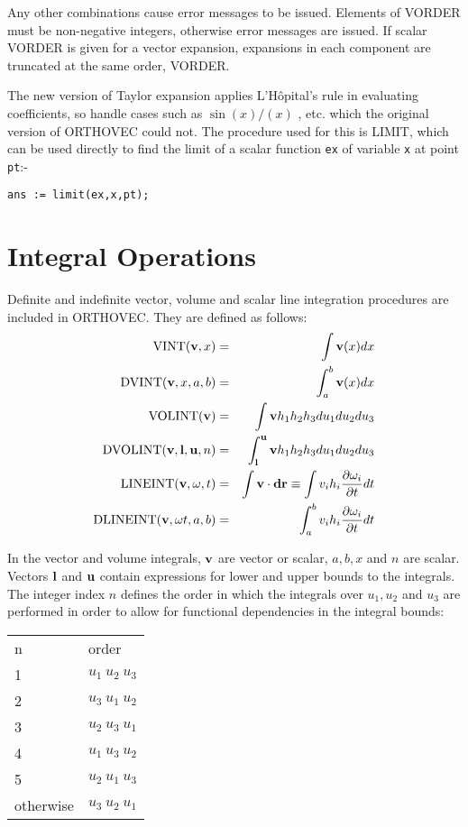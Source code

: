 Any other combinations cause error messages to be issued.  Elements of
VORDER must be non-negative integers, otherwise error
messages are issued.  If scalar VORDER is given for a vector expansion, 
expansions in each component are truncated at the same
order, VORDER.

The new version of Taylor expansion applies 
L'H\^opital's rule in evaluating coefficients, 
so handle cases such as $\sin(x) /  (x) $ , etc.
which the original version of ORTHOVEC could not. The procedure used for
this is LIMIT,
which can be used directly to find the limit of a scalar 
function {\tt ex} of variable {\tt x} at point {\tt pt}:-

\begin{verbatim}
ans := limit(ex,x,pt);
\end{verbatim}

\section{Integral Operations}
Definite and indefinite vector, volume and scalar line 
integration procedures are included in ORTHOVEC.  
They are defined as follows:
\begin{eqnarray*}
{\rm VINT} ({\bf v},x)  & = & \int {\bf v}(x)dx\\
%
{\rm DVINT} ({\bf v},x, a, b) & = & \int^b_a {\bf v} (x) dx\\
%
{\rm VOLINT} ({\bf v}) & = & \int {\bf v} h_1 h_2 h_3  du_1 du_2 du_3\\
%
{\rm DVOLINT}({\bf v},{\bf l},{\bf u},n) & = & \int^{\bf u}_{\bf l} {\bf
 v} h_1 h_2 h_3 du_1 du_2 du_3\\
%
{\rm LINEINT} ({\bf v, \omega}, t) & = & \int {\bf v} \cdot {\bf dr} 
\equiv \int v_i h_i \frac{\partial \omega_i}{\partial t} dt\\
%
{\rm DLINEINT} ({\bf v, \omega} t, a, b) & = & \int^b_a v_i h_i 
\frac{\partial \omega_i}{\partial t} dt\\
\end{eqnarray*}

In the vector and volume integrals, ${\bf v}$ are vector or scalar,  $a,
b,x$ and $n$ are scalar.  Vectors ${\bf l}$ and ${\bf u}$ contain
expressions for lower and upper bounds to the integrals.  The integer 
index $n$ defines the order in which the integrals over $u_1, u_2$
and $u_3$ are performed in order to allow for functional dependencies in
 the integral bounds:
 
\begin{tabular}{ll}
n & order\\
1 & $u_1~u_2~u_3$\\
%
2 & $u_3~u_1~u_2$\\
%
3 & $u_2~u_3~u_1$\\
%
4 & $u_1~u_3~u_2$\\
%
5 & $u_2~u_1~u_3$\\
otherwise & $u_3~u_2~u_1$\\
\end{tabular}

